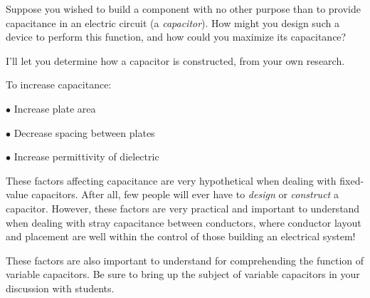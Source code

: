

Suppose you wished to build a component with no other purpose than to provide capacitance in an electric circuit (a {\it capacitor}).  How might you design such a device to perform this function, and how could you maximize its capacitance?







I'll let you determine how a capacitor is constructed, from your own research.

\vskip 10pt

To increase capacitance: 

\medskip
\item{$\bullet$} Increase plate area
\item{$\bullet$} Decrease spacing between plates
\item{$\bullet$} Increase permittivity of dielectric
\medskip







These factors affecting capacitance are very hypothetical when dealing with fixed-value capacitors.  After all, few people will ever have to {\it design} or {\it construct} a capacitor.  However, these factors are very practical and important to understand when dealing with stray capacitance between conductors, where conductor layout and placement are well within the control of those building an electrical system!

These factors are also important to understand for comprehending the function of variable capacitors.  Be sure to bring up the subject of variable capacitors in your discussion with students.




